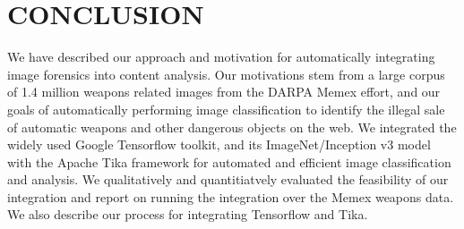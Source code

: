 \section{CONCLUSION} \label{sec:future}
We have described our approach and motivation for automatically integrating image forensics into content analysis. Our motivations stem from a large corpus of 1.4 million weapons related images from the DARPA Memex effort, and our goals of automatically performing image classification to identify the illegal sale of automatic weapons and other dangerous objects on the web. We integrated the widely used Google Tensorflow toolkit, and its ImageNet/Inception v3 model with the Apache Tika framework for automated and efficient image classification and analysis. We qualitatively and quantitiatvely evaluated the feasibility of our integration and report on running the integration over the Memex weapons data. We also describe our process for integrating Tensorflow and Tika. 
